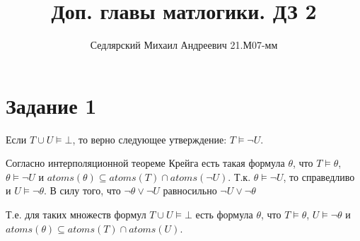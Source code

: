 \documentclass{article}
\title{Доп. главы матлогики. ДЗ 2}
\author{Седлярский Михаил Андреевич 21.М07-мм}
\date{ }
\begin{document}
\maketitle

\section*{Задание 1}
Если \(T \cup U \models \bot\), то верно следующее утверждение: 
\(T \models \neg U\).

Согласно интерполяционной теореме Крейга есть такая формула \(\theta\), что
\(T \models \theta\), \(\theta \models \neg U\) и 
\(atoms(\theta) \subseteq atoms(T) \cap atoms(\neg U)\). 
Т.к. \(\theta \models \neg U\), то справедливо и \(U \models \neg \theta\).
В силу того, что \(\neg \theta \lor \neg U\) равносильно \(\neg U \lor \neg \theta\)

Т.е. для таких множеств формул \(T \cup U \models \bot\) есть формула \(\theta\), что
\(T \models \theta\), \(U \models \neg \theta\) 
и \(atoms(\theta) \subseteq atoms(T) \cap atoms(U)\).
\end{document}
